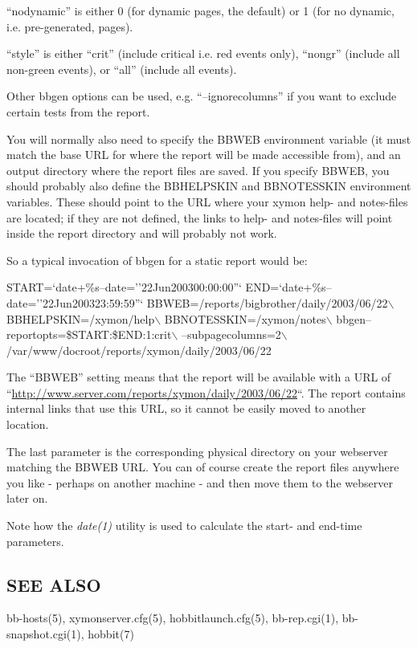   ``nodynamic'' is either 0 (for dynamic pages, the default) or 1 (for no dynamic, i.e. pre-generated, pages). 


  ``style'' is either ``crit'' (include critical i.e. red events only), ``nongr'' (include all non-green events), or ``all'' (include all events). 


  Other bbgen options can be used, e.g. ``--ignorecolumns'' if you want to exclude certain tests from the report. 


  You will normally also need to specify the BBWEB environment
  variable (it must match the base URL for where the report will be
  made accessible from), and an output directory where the report
  files are saved. If you specify BBWEB, you should probably also
  define the BBHELPSKIN and BBNOTESSKIN environment variables. These
  should point to the URL where your xymon help- and notes-files are
  located; if they are not defined, the links to help- and notes-files
  will point inside the report directory and will probably not work. 



  So a typical invocation of bbgen for a static report would be: 


  
START=`date+\%s--date=''22Jun200300:00:00''`  
END=`date+\%s--date=''22Jun200323:59:59''`  
BBWEB=/reports/bigbrother/daily/2003/06/22$\backslash$  
BBHELPSKIN=/xymon/help$\backslash$  
BBNOTESSKIN=/xymon/notes$\backslash$  
bbgen--reportopts=\$START:\$END:1:crit$\backslash$  
--subpagecolumns=2$\backslash$  
/var/www/docroot/reports/xymon/daily/2003/06/22 


  The ``BBWEB'' setting means that the report will be available with a
  URL of
  ``\url{http://www.server.com/reports/xymon/daily/2003/06/22}``. The
  report contains internal links that use this URL, so it cannot be
  easily moved to another location. 



  The last parameter is the corresponding physical directory on your
  webserver matching the BBWEB URL. You can of course create the
  report files anywhere you like - perhaps on another machine - and
  then move them to the webserver later on. 



  Note how the \emph{date(1)}
 utility is used to calculate the start- and end-time parameters. 


 
\subsection{SEE ALSO}
bb-hosts(5), xymonserver.cfg(5), hobbitlaunch.cfg(5), bb-rep.cgi(1), bb-snapshot.cgi(1), hobbit(7) 

